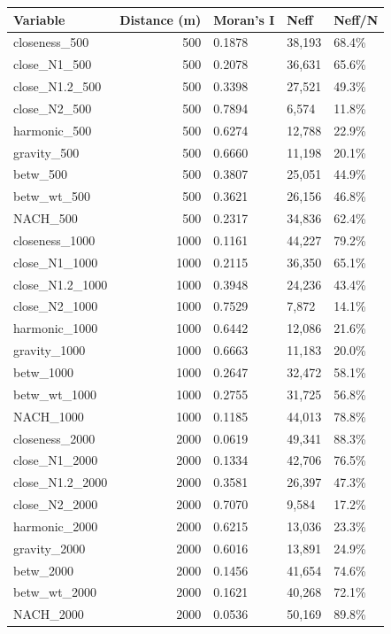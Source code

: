 \begin{tabular}{lrlll}
\toprule
Variable & Distance (m) & Moran's I & Neff & Neff/N \\
\midrule
closeness\_500 & 500 & 0.1878 & 38,193 & 68.4\% \\
close\_N1\_500 & 500 & 0.2078 & 36,631 & 65.6\% \\
close\_N1.2\_500 & 500 & 0.3398 & 27,521 & 49.3\% \\
close\_N2\_500 & 500 & 0.7894 & 6,574 & 11.8\% \\
harmonic\_500 & 500 & 0.6274 & 12,788 & 22.9\% \\
gravity\_500 & 500 & 0.6660 & 11,198 & 20.1\% \\
betw\_500 & 500 & 0.3807 & 25,051 & 44.9\% \\
betw\_wt\_500 & 500 & 0.3621 & 26,156 & 46.8\% \\
NACH\_500 & 500 & 0.2317 & 34,836 & 62.4\% \\
closeness\_1000 & 1000 & 0.1161 & 44,227 & 79.2\% \\
close\_N1\_1000 & 1000 & 0.2115 & 36,350 & 65.1\% \\
close\_N1.2\_1000 & 1000 & 0.3948 & 24,236 & 43.4\% \\
close\_N2\_1000 & 1000 & 0.7529 & 7,872 & 14.1\% \\
harmonic\_1000 & 1000 & 0.6442 & 12,086 & 21.6\% \\
gravity\_1000 & 1000 & 0.6663 & 11,183 & 20.0\% \\
betw\_1000 & 1000 & 0.2647 & 32,472 & 58.1\% \\
betw\_wt\_1000 & 1000 & 0.2755 & 31,725 & 56.8\% \\
NACH\_1000 & 1000 & 0.1185 & 44,013 & 78.8\% \\
closeness\_2000 & 2000 & 0.0619 & 49,341 & 88.3\% \\
close\_N1\_2000 & 2000 & 0.1334 & 42,706 & 76.5\% \\
close\_N1.2\_2000 & 2000 & 0.3581 & 26,397 & 47.3\% \\
close\_N2\_2000 & 2000 & 0.7070 & 9,584 & 17.2\% \\
harmonic\_2000 & 2000 & 0.6215 & 13,036 & 23.3\% \\
gravity\_2000 & 2000 & 0.6016 & 13,891 & 24.9\% \\
betw\_2000 & 2000 & 0.1456 & 41,654 & 74.6\% \\
betw\_wt\_2000 & 2000 & 0.1621 & 40,268 & 72.1\% \\
NACH\_2000 & 2000 & 0.0536 & 50,169 & 89.8\% \\
\bottomrule
\end{tabular}
